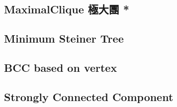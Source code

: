 \documentclass[a4paper,10pt,twocolumn,oneside]{article}
\begin{document}
\subsection{MaximalClique 極大團 *}

% 

%

% 

% 

% 

% 

\subsection{Minimum Steiner Tree}


\subsection{BCC based on vertex}


\subsection{Strongly Connected Component}

\end{document}
